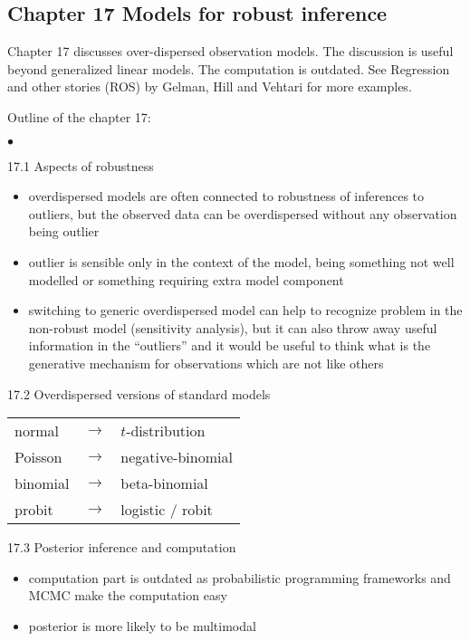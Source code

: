 \documentclass[a4paper,11pt]{article}
\begin{document}
\subsection*{Chapter 17 Models for robust inference}

Chapter 17 discusses over-dispersed observation models. The discussion
is useful beyond generalized linear models.  The computation is
outdated. See Regression and other stories (ROS) by Gelman, Hill
and Vehtari for more examples.

\vspace{\baselineskip}
\noindent
Outline of the chapter 17:
\begin{list}{$\bullet$}{\parsep=0pt\itemsep=2pt}
 \item[17.1] Aspects of robustness
  \begin{itemize}
  \item overdispersed models are often connected to robustness of
    inferences to outliers, but the observed data can be overdispersed
    without any observation being outlier
  \item outlier is sensible only in the context of the model, being
    something not well modelled or something requiring extra model
    component
  \item switching to generic overdispersed model can help to recognize
    problem in the non-robust model (sensitivity analysis), but it
    can also throw away useful information in the ``outliers'' and it
    would be useful to think what is the generative mechanism for
    observations which are not like others
  \end{itemize}
  \item[17.2] Overdispersed versions of standard models\\
    \begin{tabular}[t]{lcl}\small
      normal & $\rightarrow$ & $t$-distribution\\
      Poisson & $\rightarrow$ & negative-binomial \\
      binomial & $\rightarrow$ & beta-binomial \\
      probit & $\rightarrow$ & logistic / robit 
    \end{tabular}
  \item[17.3] Posterior inference and computation
    \begin{itemize}
    \item computation part is outdated as probabilistic programming
      frameworks and MCMC make the computation easy
    \item posterior is more likely to be multimodal

\end{itemize}
\end{list}
\end{document}
